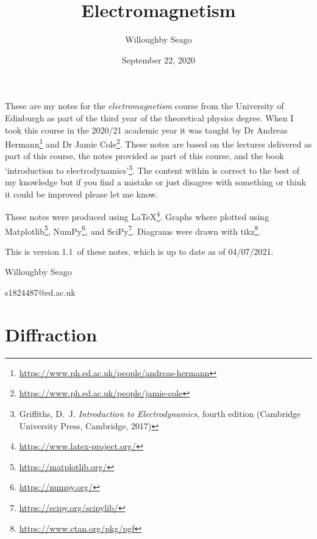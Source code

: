 \documentclass[a4paper]{article}
\author{Willoughby Seago}
\date{September 22, 2020}
\title{Electromagnetism}
\newcommand{\notesVersion}{1.1}
\newcommand{\notesDate}{04/07/2021}
\begin{document}
    \maketitle
    These are my notes for the \textit{electromagnetism} course from the University of Edinburgh as part of the third year of the theoretical physics degree.
    When I took this course in the 2020/21 academic year it was taught by Dr Andreas Hermann\footnote{\url{https://www.ph.ed.ac.uk/people/andreas-hermann}} and Dr Jamie Cole\footnote{\url{https://www.ph.ed.ac.uk/people/jamie-cole}}.
    These notes are based on the lectures delivered as part of this course, the notes provided as part of this course, and the book `introduction to electrodynamics'\footnote{Griffiths, D.~J. \textit{Introduction to Electrodynamics}, fourth edition (Cambridge University Press, Cambridge, 2017)}.
    The content within is correct to the best of my knowledge but if you find a mistake or just disagree with something or think it could be improved please let me know.
    
    These notes were produced using \LaTeX\footnote{\url{https://www.latex-project.org/}}.
    Graphs where plotted using Matplotlib\footnote{\url{https://matplotlib.org/}}, NumPy\footnote{\url{https://numpy.org/}}, and SciPy\footnote{\url{https://scipy.org/scipylib/}}.
    Diagrams were drawn with tikz\footnote{\url{https://www.ctan.org/pkg/pgf}}.
    
    This is version \notesVersion~of these notes, which is up to date as of \notesDate.
    \begin{flushright}
        Willoughby Seago
        
        s1824487@ed.ac.uk
    \end{flushright}
    \clearpage
    \tableofcontents
    \listoffigures
    \printglossary[type=\acronymtype, title=Acronyms, style=long]
    \clearpage
    \begingroup
    \let\clearpage\relax  %
    
    
    
    
    
    
    \endgroup
    
    \part{Diffraction}
\end{document}
